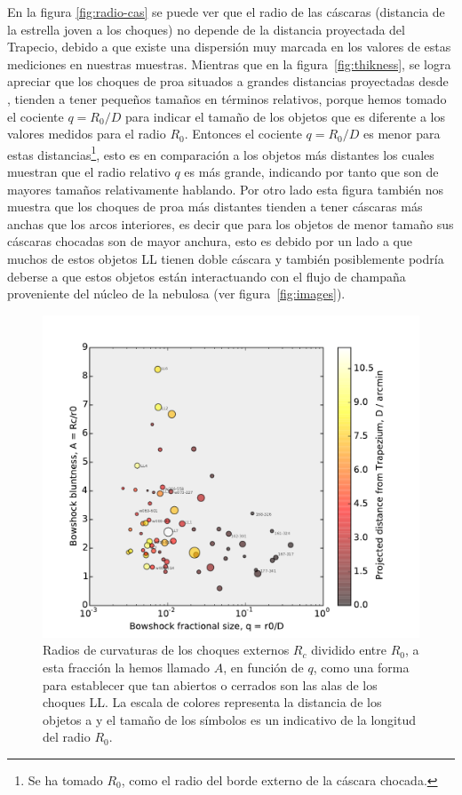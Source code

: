  En la figura \ref{fig:radio-cas} se puede ver que el radio de las cáscaras (distancia de la estrella joven a los choques) no depende de la distancia proyectada del Trapecio, debido a que existe una dispersión muy marcada en los valores de estas mediciones en nuestras muestras. Mientras que en la figura~\ref{fig:thikness}, se logra apreciar que los choques de proa situados a grandes distancias  proyectadas desde \thC{}, tienden a tener  pequeños tamaños en términos relativos, porque hemos tomado el cociente \(q = R_{0}/D\) para indicar el tamaño de los objetos que es diferente a los valores medidos para el radio \(R_{0}\).  Entonces el cociente \(q = R_{0}/D\) es menor para estas distancias\footnote{Se ha tomado \(R_{0}\), como el radio del borde externo de la cáscara chocada.}, esto es en comparación a los objetos más distantes los cuales muestran que el radio relativo \(q\) es más grande, indicando por tanto que son de mayores tamaños relativamente hablando. Por otro lado esta figura también nos muestra que los choques de proa más distantes tienden a tener cáscaras más anchas que los arcos interiores, es decir que para los objetos de menor tamaño sus cáscaras chocadas son de mayor anchura, esto es debido por un lado a que muchos de estos objetos LL tienen doble cáscara y también posiblemente podría deberse a que estos objetos están interactuando con el flujo de champaña proveniente del núcleo de la nebulosa (ver figura~\ref{fig:images}).\\ 

\begin{figure}
  \centering
  \includegraphics[width=\linewidth]{luis-programas/will-A-vs-q}
  \caption{Radios de curvaturas de los choques externos \(R_{c}\) dividido entre \(R_{0}\), a esta fracción la hemos llamado \(A\), en función de \(q\), como una forma para establecer que tan abiertos o cerrados son las alas de los choques LL. La escala de colores representa la distancia de los objetos a \thC{} y el tamaño de los símbolos es un indicativo de la longitud del radio \(R_{0}\).}
  \label{fig:radii-curvatures}
\end{figure} 

